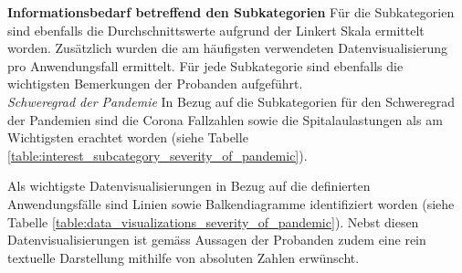 \noindent
\textbf{Informationsbedarf betreffend den Subkategorien}
\newline
\indent
Für die Subkategorien sind ebenfalls die Durchschnittswerte aufgrund der Linkert Skala ermittelt worden. Zusätzlich wurden die am häufigsten verwendeten Datenvisualisierung pro Anwendungsfall ermittelt. Für jede Subkategorie sind ebenfalls die wichtigsten Bemerkungen der Probanden aufgeführt.\\

\noindent
\textit{Schweregrad der Pandemie}
\newline
\indent
In Bezug auf die Subkategorien für den Schweregrad der Pandemien sind die Corona Fallzahlen sowie die Spitalaulastungen als am Wichtigsten erachtet worden (siehe Tabelle \ref{table:interest_subcategory_severity_of_pandemic}).

\begin{table}[h]
\centering
{}
\caption{Interessenzrelevanz der Probanden für Unterkategorien des Bereichs ``Schweregrad der Pandemie`` (Eigene Darstellung)}
\label{table:interest_subcategory_severity_of_pandemic}
\end{table}

\clearpage
Als wichtigste Datenvisualisierungen in Bezug auf die definierten Anwendungsfälle sind Linien sowie Balkendiagramme identifiziert worden (siehe Tabelle \ref{table:data_visualizations_severity_of_pandemic}). Nebst diesen Datenvisualisierungen ist gemäss Aussagen der Probanden zudem eine rein textuelle Darstellung mithilfe von absoluten Zahlen erwünscht.

